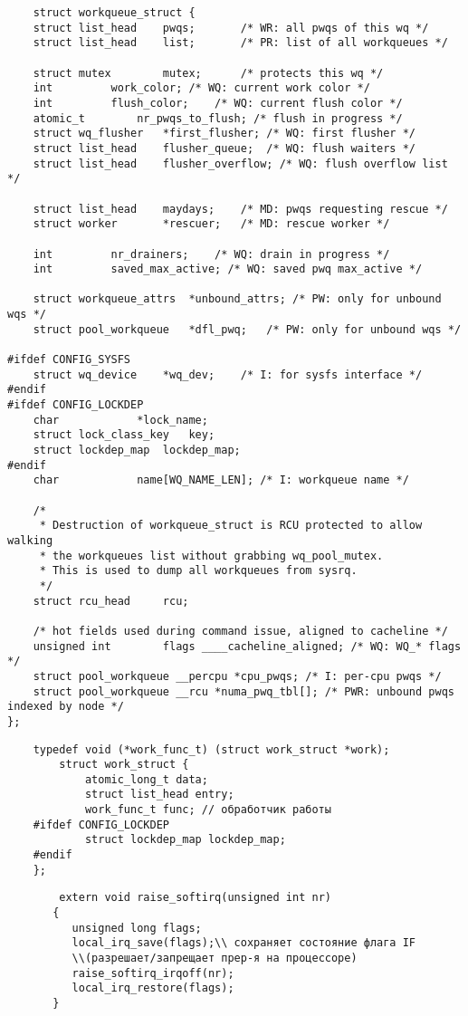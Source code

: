 \begin{lstlisting}
	struct workqueue_struct {
	struct list_head	pwqs;		/* WR: all pwqs of this wq */
	struct list_head	list;		/* PR: list of all workqueues */

	struct mutex		mutex;		/* protects this wq */
	int			work_color;	/* WQ: current work color */
	int			flush_color;	/* WQ: current flush color */
	atomic_t		nr_pwqs_to_flush; /* flush in progress */
	struct wq_flusher	*first_flusher;	/* WQ: first flusher */
	struct list_head	flusher_queue;	/* WQ: flush waiters */
	struct list_head	flusher_overflow; /* WQ: flush overflow list */

	struct list_head	maydays;	/* MD: pwqs requesting rescue */
	struct worker		*rescuer;	/* MD: rescue worker */

	int			nr_drainers;	/* WQ: drain in progress */
	int			saved_max_active; /* WQ: saved pwq max_active */

	struct workqueue_attrs	*unbound_attrs;	/* PW: only for unbound wqs */
	struct pool_workqueue	*dfl_pwq;	/* PW: only for unbound wqs */

#ifdef CONFIG_SYSFS
	struct wq_device	*wq_dev;	/* I: for sysfs interface */
#endif
#ifdef CONFIG_LOCKDEP
	char			*lock_name;
	struct lock_class_key	key;
	struct lockdep_map	lockdep_map;
#endif
	char			name[WQ_NAME_LEN]; /* I: workqueue name */

	/*
	 * Destruction of workqueue_struct is RCU protected to allow walking
	 * the workqueues list without grabbing wq_pool_mutex.
	 * This is used to dump all workqueues from sysrq.
	 */
	struct rcu_head		rcu;

	/* hot fields used during command issue, aligned to cacheline */
	unsigned int		flags ____cacheline_aligned; /* WQ: WQ_* flags */
	struct pool_workqueue __percpu *cpu_pwqs; /* I: per-cpu pwqs */
	struct pool_workqueue __rcu *numa_pwq_tbl[]; /* PWR: unbound pwqs indexed by node */
};
\end{lstlisting}

\begin{lstlisting}
	typedef void (*work_func_t) (struct work_struct *work);
		struct work_struct {
			atomic_long_t data;
			struct list_head entry;
			work_func_t func; // обработчик работы
	#ifdef CONFIG_LOCKDEP
			struct lockdep_map lockdep_map;
	#endif
	};
	\end{lstlisting}

	\begin{lstlisting}
		extern void raise_softirq(unsigned int nr)
	   {
		  unsigned long flags;
		  local_irq_save(flags);\\ сохраняет состояние флага IF
		  \\(разрешает/запрещает прер-я на процессоре)
		  raise_softirq_irqoff(nr);
		  local_irq_restore(flags);
	   }
	  \end{lstlisting}

